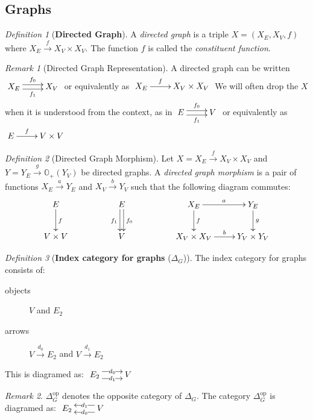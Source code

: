 \documentclass[10pt]{article}
\newcommand{\onearrow}[3]{\mbox{$#1 \stackrel{#2}{\longrightarrow} #3$}}
\theoremstyle{remark}
\newtheorem{remark}{Remark}
\newtheorem{definition}{Definition}
\begin{document}
\subsection{Graphs}

\begin{definition}[\textbf{Directed Graph}]
A \emph{directed graph} is a triple $X=(X_E, X_V, f)$ where \onearrow{X_E}{f}{X_V \times X_V}. The function $f$
is called the \emph{constituent function}.
\end{definition}

\begin{remark}[Directed Graph Representation]
A directed graph can be written
$\xymatrix{
     X_E \ar@<0.6ex>[r]^-{f_0} \ar@<-0.6ex>[r]_-{f_1} & X_V
}$
or equivalently as
$\xymatrix{
     X_E \ar[r]^-{f} & X_V \times X_V
}$
We will often drop the $X$ when it is understood from the context, as in
$\xymatrix{
     E \ar@<0.6ex>[r]^-{f_0} \ar@<-0.6ex>[r]_-{f_1} & V
}$
or equivalently as
$\xymatrix{
     E \ar[r]^-{f} & V \times V
}$
\end{remark}

\begin{definition}[Directed Graph Morphism]
Let $X=\onearrow{X_E}{f}{X_V \times X_V}$ and $Y=\onearrow{Y_E}{g}{\mathbb{O}_{+} (Y_V)}$ be directed graphs. A \emph{directed graph morphism} is a pair of functions \onearrow{X_E}{a}{Y_E} and \onearrow{X_V}{b}{Y_V} such that the following diagram commutes:
$$\xymatrix{
E \ar[d]^f & & E  \ar@<-0.5ex>[d]_{f_1} \ar@<0.5ex>[d]^{f_0} & & X_E  \ar[d]^f \ar[r]^-a  & Y_E  \ar[d]^g \\ 
V \times V & &V & &  X_V \times X_V   \ar[r]^-b       & Y_V \times Y_V
}$$
\end{definition}

\begin{definition}[\textbf{Index category for graphs} ($\Delta_G$)]
The index category for graphs consists of:
\begin{description}
\item [objects] $V$ and $E_2$
\item [arrows] \onearrow{V}{d_0}{E_2} and \onearrow{V}{d_1}{E_2}
\end{description}

This is diagramed as:
$\xymatrix{
     E_2 \ar@<1ex>[r]|-{d_0} \ar@<-1ex>[r]|-{d_1} & V
     }$
\end{definition}

\begin{remark}
$\Delta_G^{\text{op}}$ denotes the opposite category of $\Delta_G$.
The category $\Delta_G^{\text{op}}$ is diagramed as:
$\xymatrix{
     E_2 & V \ar@<1ex>[l]|-{d_0} \ar@<-1ex>[l]|-{d_1}
     }$
\end{remark}
\end{document}
